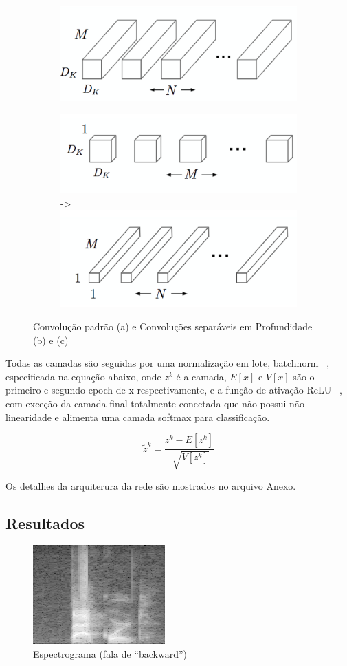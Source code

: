 \documentclass{bmvc2k}
\begin{document}
\begin{figure}[h]
\centering
    \begin{subfigure}[]
        \centering
         \includegraphics[width=0.4\linewidth]{imagens/mn1.png} 
    \end{subfigure}

    \begin{subfigure}[]
    \centering
         \includegraphics[width=0.4\linewidth]{imagens/mn2.png} ->
         \includegraphics[width=0.4\linewidth]{imagens/mn3.png}
    \end{subfigure}
    \label{MN}
    \caption{Convolução padrão (a) e Convoluções separáveis em Profundidade (b) e (c)}
\end{figure}


Todas as camadas são seguidas por uma normalização em lote, batchnorm ~\cite{batch}, especificada na equação abaixo, onde $z^k$ é a camada, $E[x]$ e $V[x]$ são o primeiro e segundo epoch de x respectivamente, e  a função de ativação ReLU ~\cite{relu}, com exceção da camada final totalmente conectada que não possui não-linearidade e alimenta uma camada softmax para classificação.

\begin{equation}
\tilde z ^k = \frac{z^k - E[z^k]}{\sqrt[]{V[z^k]}}
\end{equation}

Os detalhes da arquiterura da rede são mostrados no arquivo Anexo.

\subsection*{Resultados}

\begin{figure}[ht]
\centering
\includegraphics[scale=0.4]{imagens/spect.png} 
\caption{Espectrograma (fala de ``backward'')}
\end{figure}
\end{document}
